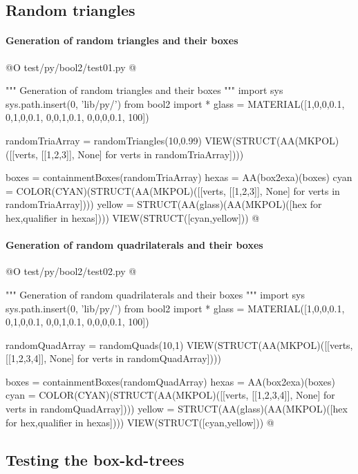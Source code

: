 \documentclass[11pt,oneside]{article}    %
\begin{document}
\subsection{Random triangles}


\paragraph{Generation of random triangles and their boxes}
@O test/py/bool2/test01.py
@{""" Generation of random triangles and their boxes """
import sys
sys.path.insert(0, 'lib/py/')
from bool2 import *
glass = MATERIAL([1,0,0,0.1,  0,1,0,0.1,  0,0,1,0.1, 0,0,0,0.1, 100])

randomTriaArray = randomTriangles(10,0.99)
VIEW(STRUCT(AA(MKPOL)([[verts, [[1,2,3]], None] for verts in randomTriaArray])))

boxes = containmentBoxes(randomTriaArray)
hexas = AA(box2exa)(boxes)
cyan = COLOR(CYAN)(STRUCT(AA(MKPOL)([[verts, [[1,2,3]], None] for verts in randomTriaArray])))
yellow = STRUCT(AA(glass)(AA(MKPOL)([hex for hex,qualifier in hexas])))
VIEW(STRUCT([cyan,yellow]))
@}


\paragraph{Generation of random quadrilaterals and their boxes}
@O test/py/bool2/test02.py
@{""" Generation of random quadrilaterals and their boxes """
import sys
sys.path.insert(0, 'lib/py/')
from bool2 import *
glass = MATERIAL([1,0,0,0.1,  0,1,0,0.1,  0,0,1,0.1, 0,0,0,0.1, 100])

randomQuadArray = randomQuads(10,1)
VIEW(STRUCT(AA(MKPOL)([[verts, [[1,2,3,4]], None] for verts in randomQuadArray])))

boxes = containmentBoxes(randomQuadArray)
hexas = AA(box2exa)(boxes)
cyan = COLOR(CYAN)(STRUCT(AA(MKPOL)([[verts, [[1,2,3,4]], None] for verts in randomQuadArray])))
yellow = STRUCT(AA(glass)(AA(MKPOL)([hex for hex,qualifier in hexas])))
VIEW(STRUCT([cyan,yellow]))
@}




\subsection{Testing the box-kd-trees}
\end{document}
